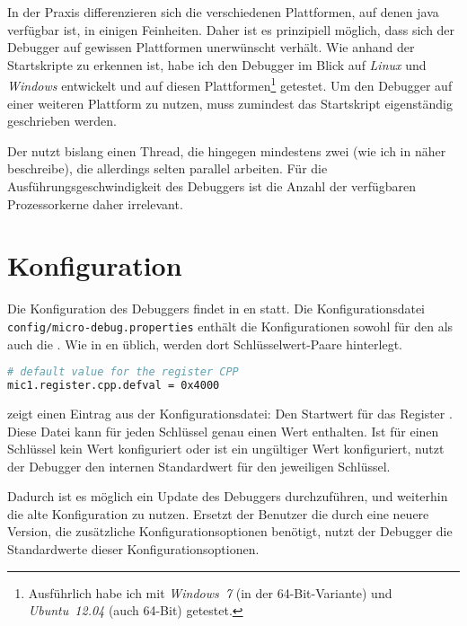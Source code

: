 In der Praxis differenzieren sich die verschiedenen Plattformen, auf denen \gls{java} verfügbar ist, in einigen Feinheiten. Daher ist es prinzipiell möglich, dass sich der Debugger auf gewissen Plattformen unerwünscht verhält. Wie anhand der Startskripte zu erkennen ist, habe ich den Debugger im Blick auf \emph{Linux} und \emph{Windows} entwickelt und auf diesen Plattformen\footnote{Ausführlich habe ich mit \emph{Windows~7} (in der 64-Bit-Variante) und \emph{Ubuntu~12.04} (auch 64-Bit) getestet.} getestet. Um den Debugger auf einer weiteren Plattform zu nutzen, muss zumindest das Startskript eigenständig geschrieben werden.

Der \md nutzt bislang einen Thread, die \mdg hingegen mindestens zwei (wie ich in  näher beschreibe), die allerdings selten parallel arbeiten. Für die Ausführungsgeschwindigkeit des Debuggers ist die Anzahl der verfügbaren Prozessorkerne daher irrelevant.

\section{Konfiguration}
Die Konfiguration des Debuggers findet in en statt. Die Konfigurationsdatei \texttt{config/micro-debug.properties} enthält die Konfigurationen sowohl für den \md als auch die \mdg. Wie in en üblich, werden dort Schlüsselwert-Paare hinterlegt.

\begin{lstlisting}[language=sh,caption={Eintrag in \texttt{conf/micro-debug.properties}},label=\lstlbl{md-props-entry}]
# default value for the register CPP
mic1.register.cpp.defval = 0x4000
\end{lstlisting}

 zeigt einen Eintrag aus der Konfigurationsdatei: Den Startwert für das Register . Diese Datei kann für jeden Schlüssel genau einen Wert enthalten. Ist für einen Schlüssel kein Wert konfiguriert oder ist ein ungültiger Wert konfiguriert, nutzt der Debugger den internen Standardwert für den jeweiligen Schlüssel.

Dadurch ist es möglich ein Update des Debuggers durchzuführen, und weiterhin die alte Konfiguration zu nutzen. Ersetzt der Benutzer die  durch eine neuere Version, die zusätzliche Konfigurationsoptionen benötigt, nutzt der Debugger die Standardwerte dieser Konfigurationsoptionen.

